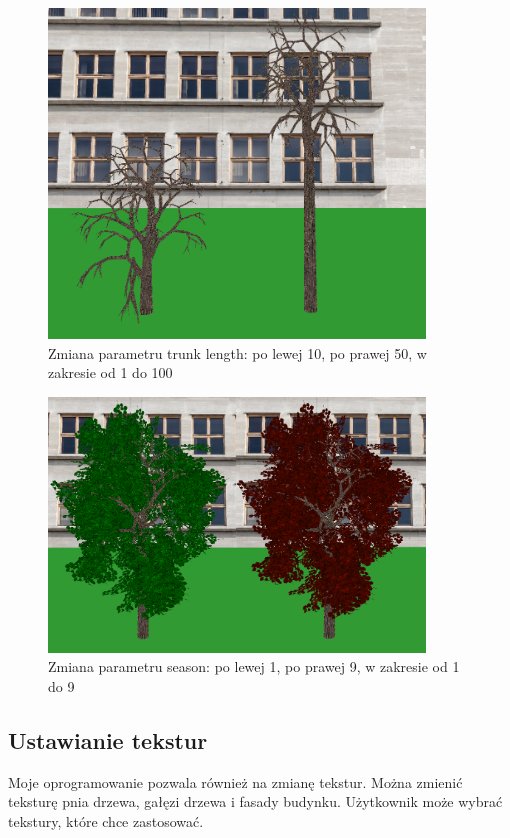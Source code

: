 \documentclass[a4paper,twoside,12pt]{report}
\begin{document}
\begin{figure}[H]
	\centering\includegraphics[width=10cm]{grafika/params/TrunkLen.png}
	\caption{Zmiana parametru trunk length: po lewej 10, po prawej 50, w zakresie od 1 do 100}
    \label{fig:trunkLen}
\end{figure}

\begin{figure}[H]
	\centering\includegraphics[width=10cm]{grafika/params/Season.png}
	\caption{Zmiana parametru season: po lewej 1, po prawej 9, w zakresie od 1 do 9}
    \label{fig:season}
\end{figure}

\subsection{Ustawianie tekstur}

Moje oprogramowanie pozwala również na zmianę tekstur. 
Można zmienić teksturę pnia drzewa, gałęzi drzewa i fasady budynku.
Użytkownik może wybrać tekstury, które chce zastosować. 
\end{document}
